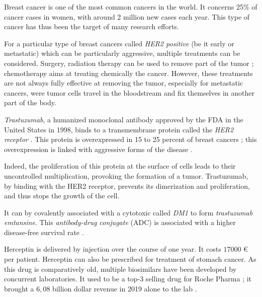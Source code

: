 Breast cancer is one of the most common cancers in the world.
It concerns 25\% of cancer cases in women, with around 2 million new cases
each year. This type of cancer has thus been the target of many research efforts.

For a particular type of breast cancers called \emph{HER2 positive} (be it early 
or metastatic) which can be particularly aggressive, multiple treatments can
be considered. Surgery, radiation therapy can be used to remove part of the tumor ;
chemotherapy aims at treating chemically the cancer. However, these treatments are
not always fully effective at removing the tumor, especially for metastatic cancers,
were tumor cells travel in the bloodstream and fix themselves in another
part of the body.

\emph{Trastuzumab}, a humanized monoclonal antibody approved by the FDA in the 
United States in 1998, binds to a transmembrane protein called 
the \emph{HER2 receptor} \cite{zhao_trastuzumab_2021}. This protein is
overexpressed in 15 to 25 percent of breast cancers ; this overexpression
is linked with aggressive forms of the disease \cite{piccart-gebhart_trastuzumab_2005}.

Indeed, the proliferation of this protein at the surface of cells leads to their
uncontrolled multiplication, provoking the formation of a tumor.
Trastuzumab, by binding with the HER2 receptor, prevents its dimerization and
proliferation, and thus stops the growth of the cell.

It can by covalently associated with a cytotoxic called \emph{DM1} to form
\emph{trastuzumab emtansine}. This \emph{antibody-drug conjugate} (ADC) 
is associated with a higher disease-free survival rate
\cite{lambert_ado-trastuzumab_2014}.

Herceptin is delivered by injection over the course of one year.
It costs $17000$ € per patient. Herceptin can also be prescribed for treatment of stomach cancer. 
As this drug is comparatively old, multiple
biosimilars have been developed by concurrent laboratories. It used to be a
top-3 selling drug for Roche Pharma ; it brought a $6,08$ billion dollar
revenue in 2019 alone to the lab \cite{fierce_pharma_herceptin_2020}.


